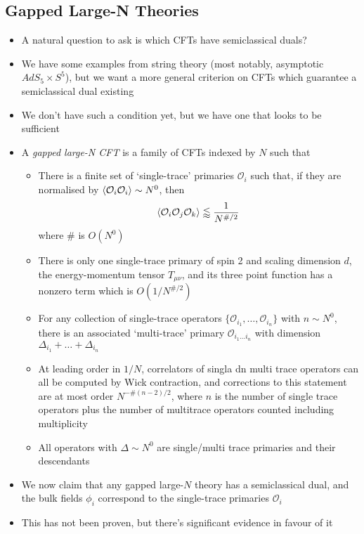 \documentclass[12pt,a4paper]{article}
\numberwithin{equation}{section}
\begin{document}
	\subsection{Gapped Large-N Theories}
	\begin{itemize}
		\item A natural question to ask is which CFTs have semiclassical duals?
		\item We have some examples from string theory (most notably, asymptotic $AdS_{5}\times S^{5}$), but we want a more general criterion on CFTs which guarantee a semiclassical dual existing
		\item We don't have such a condition yet, but we have one that looks to be sufficient
		\item A \textit{gapped large-N CFT} is a family of CFTs indexed by $N$ such that
		\begin{itemize}
			\item There is a finite set of `single-trace' primaries $\mathcal{O}_{i}$ such that, if they are normalised by $\braket{\mathcal{O}_{i}\mathcal{O}_{i}}\sim N^{0}$, then
			\begin{equation}
				\braket{\mathcal{O}_{i}\mathcal{O}_{j}\mathcal{O}_{k}}\lessapprox\frac{1}{N^{\#/2}}
			\end{equation}
			where $\#$ is $O(N^{0})$
			\item There is only one single-trace primary of spin 2 and scaling dimension $d$, the energy-momentum tensor $T_{\mu\nu}$, and its three point function has a nonzero term which is $O(1/N^{\#/2})$
			\item For any collection of single-trace operators $\{\mathcal{O}_{i_{1}},\ldots,\mathcal{O}_{i_{n}}\}$ with $n\sim N^{0}$, there is an associated `multi-trace' primary $\mathcal{O}_{i_{1}\ldots i_{n}}$ with dimension $\Delta_{i_{1}}+\ldots+\Delta_{i_{n}}$
			\item At leading order in $1/N$, correlators of singla dn multi trace operators can all be computed by Wick contraction, and corrections to this statement are at most order $N^{-\#(n-2)/2}$, where $n$ is the number of single trace operators plus the number of multitrace operators counted including multiplicity
			\item All operators with $\Delta\sim N^{0}$ are single/multi trace primaries and their descendants
		\end{itemize}
		\item We now claim that any gapped large-$N$ theory has a semiclassical dual, and the bulk fields $\phi_{i}$ correspond to the single-trace primaries $\mathcal{O}_{i}$
		\item This has not been proven, but there's significant evidence in favour of it
	\end{itemize}
\end{document}
